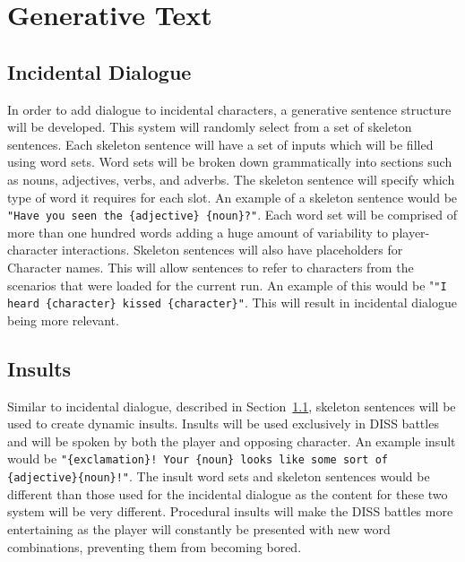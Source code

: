 \clearpage
\section{Generative Text}

\subsection{Incidental Dialogue}
\label{sec:incidental_dialogue}
In order to add dialogue to incidental characters, a generative sentence structure will be developed. This system will randomly select from a set of skeleton sentences. Each skeleton sentence will have a set of inputs which will be filled using word sets. Word sets will be broken down grammatically into sections such as nouns, adjectives, verbs, and adverbs. The skeleton sentence will specify which type of word it requires for each slot. An example of a skeleton sentence would be \verb|"Have you seen the {adjective} {noun}?"|. Each word set will be comprised  of more than one hundred words adding a huge amount of variability to player-character interactions. Skeleton sentences will also have placeholders for Character names. This will allow sentences to refer to characters from the scenarios that were loaded for the current run. An example of this would be "\verb|"I heard {character} kissed {character}"|. This will result in incidental dialogue being more relevant. 

\subsection{Insults}
Similar to incidental dialogue, described in Section~\ref{sec:incidental_dialogue}, skeleton sentences  will be used to create dynamic insults. Insults will be used exclusively in DISS battles and will be spoken by both the player and opposing character. An example insult would be \verb|"{exclamation}! Your {noun} looks like some sort of {adjective}{noun}!"|. The insult word sets and skeleton sentences would be different than those used for the incidental dialogue as the content for these two system will be very different. Procedural insults will make the DISS battles more entertaining as the player will constantly be presented with new word combinations, preventing them from becoming bored. 